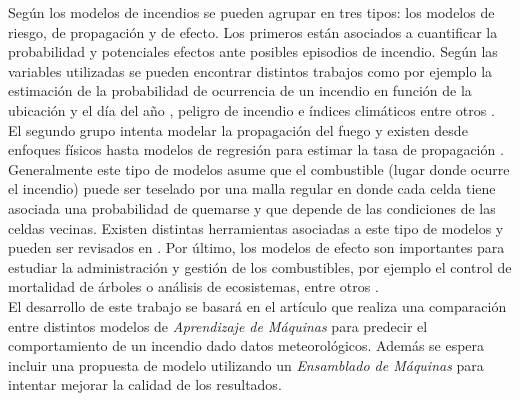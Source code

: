 \documentclass[spanish]{article}
\begin{document}
            
            Según \cite{preisler2013forest} los modelos de incendios se pueden agrupar en tres tipos: los modelos de riesgo, de 
            propagación y de efecto. Los primeros están asociados a cuantificar la probabilidad y potenciales efectos ante 
            posibles episodios de incendio. Según las variables utilizadas se pueden encontrar distintos trabajos como por ejemplo
            la estimación de la probabilidad de ocurrencia de un incendio en función de la ubicación y el día del año 
            \cite{brillinger2003risk,hernandez2010integrating}, peligro de incendio e índices climáticos \cite{van1987development,
            burgan19881988} entre otros \cite{braun2010forest,ager2007modeling,calkin2011comparative}. El segundo grupo intenta 
            modelar la propagación del fuego y existen desde enfoques físicos \cite{rothermel1972mathematical} hasta modelos de 
            regresión para estimar la tasa de propagación \cite{sullivan2009wildland}. Generalmente este tipo de modelos asume que 
            el combustible (lugar donde ocurre el incendio) puede ser teselado por una malla regular en donde cada celda tiene 
            asociada una probabilidad de quemarse y que depende de las condiciones de las celdas vecinas. Existen distintas 
            herramientas asociadas a este tipo de modelos y pueden ser revisados en \cite{andrews1986behave,finney2006overview,
            finney1998farsite,finney2011simulation,finney2011method}. Por último, los modelos de efecto son importantes
            para estudiar la administración y gestión de los combustibles, por ejemplo el control de mortalidad de árboles 
            o análisis de ecosistemas, entre otros \cite{Larkin-2009,reinhardt2003using,robichaud2007predicting}. \\
            
            El desarrollo de este trabajo se basará en el artículo \cite{cortez} que realiza una comparación entre distintos 
            modelos de \emph{Aprendizaje de Máquinas} para predecir el comportamiento de un incendio dado datos meteorológicos. 
            Además se espera incluir una propuesta de modelo utilizando un \emph{Ensamblado de Máquinas} para intentar mejorar 
            la calidad de los resultados. 
            
\end{document}
